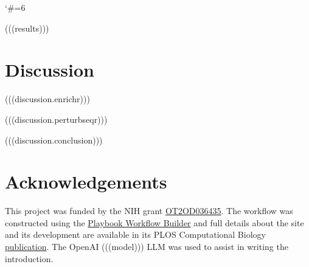 \documentclass{ExcelAtFIT}
\begin{document}
\begin{table}[!htbp]
\centering
\caption{(((tables.perturbseqrGeneMimickers.caption)))}
\label{table:perturbseqrGeneMimickers}
\end{table}

\begin{table}[!htbp]
\centering
\caption{(((tables.perturbseqrDrugMimickers.caption)))}
\label{table:perturbseqrDrugMimickers}
\end{table}

\begin{table}[!htbp]
\centering
\caption{(((tables.perturbseqrGeneReversers.caption)))}
\label{table:perturbseqrGeneReversers}
\end{table}

\begin{table}[!htbp]
\centering
\caption{(((tables.perturbseqrDrugReversers.caption)))}
\label{table:perturbseqrDrugReversers}
\end{table}
\catcode`#=6

(((results)))

\section{Discussion}\label{Discussion}
(((discussion.enrichr)))

(((discussion.perturbseqr)))

(((discussion.conclusion)))

\section*{Acknowledgements}\label{Acknowledgements}
This project was funded by the NIH grant \href{https://reporter.nih.gov/search/SdeFoZSP2U2zRTjMZKFHlQ/project-details/11080094}{OT2OD036435}.
The workflow was constructed using the \href{https://playbook-workflow-builder.cloud/}{Playbook Workflow Builder} and full details about the site and its development are available in its PLOS Computational Biology \href{https://doi.org/10.1371/journal.pcbi.1012901}{publication}.
The OpenAI (((model))) LLM was used to assist in writing the introduction.

{\small
\printbibliography
}
\end{document}
